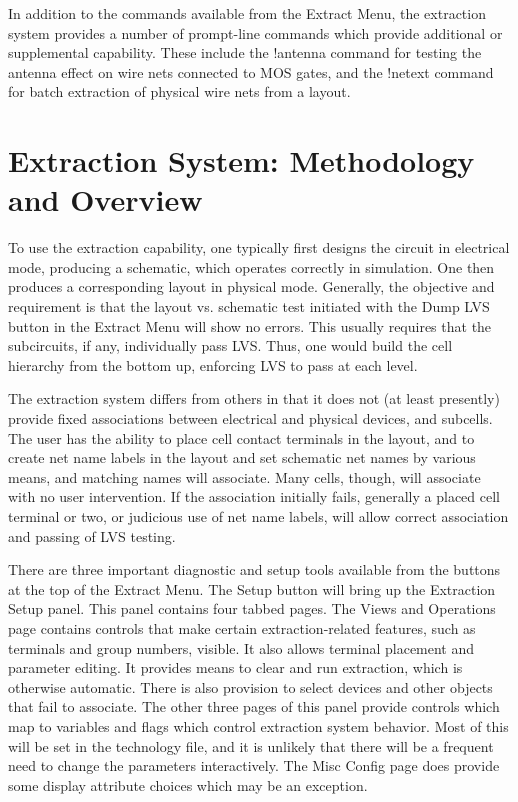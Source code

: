 In addition to the commands available from the {\cb Extract Menu}, the
extraction system provides a number of prompt-line commands which
provide additional or supplemental capability.  These include the {\cb
!antenna} command for testing the antenna effect on wire nets
connected to MOS gates, and the {\cb !netext} command for batch
extraction of physical wire nets from a layout.


\section{Extraction System: Methodology and Overview}
To use the extraction capability, one typically first designs the
circuit in electrical mode, producing a schematic, which operates
correctly in simulation.  One then produces a corresponding layout in
physical mode.  Generally, the objective and requirement is that the
layout vs.  schematic test initiated with the {\cb Dump LVS} button in
the {\cb Extract Menu} will show no errors.  This usually requires
that the subcircuits, if any, individually pass LVS.  Thus, one would
build the cell hierarchy from the bottom up, enforcing LVS to pass at
each level.

The {\Xic} extraction system differs from others in that it does not
(at least presently) provide fixed associations between electrical and
physical devices, and subcells.  The user has the ability to place
cell contact terminals in the layout, and to create net name labels in
the layout and set schematic net names by various means, and matching
names will associate.  Many cells, though, will associate with no user
intervention.  If the association initially fails, generally a placed
cell terminal or two, or judicious use of net name labels, will allow
correct association and passing of LVS testing.

There are three important diagnostic and setup tools available from
the buttons at the top of the {\cb Extract Menu}.  The {\cb Setup}
button will bring up the {\cb Extraction Setup} panel.  This panel
contains four tabbed pages.  The {\cb Views and Operations} page
contains controls that make certain extraction-related features, such
as terminals and group numbers, visible.  It also allows terminal
placement and parameter editing.  It provides means to clear and run
extraction, which is otherwise automatic.  There is also provision to
select devices and other objects that fail to associate.  The other
three pages of this panel provide controls which map to variables and
flags which control extraction system behavior.  Most of this will be
set in the technology file, and it is unlikely that there will be a
frequent need to change the parameters interactively.  The {\cb Misc
Config} page does provide some display attribute choices which may be
an exception.

